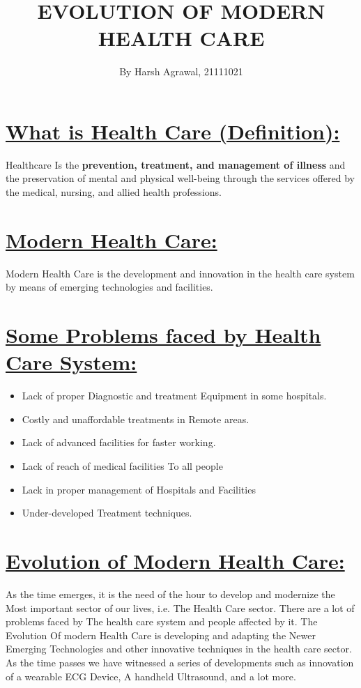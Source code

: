 \documentclass[12pt]{article}
\title{\textbf{EVOLUTION OF MODERN HEALTH CARE}}
\author{By Harsh Agrawal, 21111021}
\date{}
\begin{document}
\maketitle
\raggedright{\section{\underline{What is Health Care (Definition):}}}
Healthcare Is the \textbf{prevention, treatment, and management of illness} and the preservation of mental and physical well-being through the services offered by the medical, nursing, and allied health professions.
\newline
\section{\underline{Modern Health Care:}}
Modern Health Care is the development and innovation in the health care system by means of emerging technologies and facilities.
\newline
\section{\underline{Some Problems faced by Health Care System:}}
\begin{itemize}
\item Lack of proper Diagnostic and treatment Equipment in some hospitals.
\item Costly and unaffordable treatments in Remote areas.
\item Lack of advanced facilities for faster working.
\item Lack of reach of medical facilities To all people
\item Lack in proper management of Hospitals and Facilities
\item Under-developed Treatment techniques.
\end{itemize}

\section{\underline{Evolution of Modern Health Care:}}
As the time emerges, it is the need of the hour to develop and modernize the Most important sector of our lives, i.e. The Health Care sector. There are a lot of problems faced by The health care system and people affected by it. The Evolution Of modern Health Care is developing and adapting the Newer Emerging Technologies and other innovative techniques in the health care sector. As the time passes we have witnessed a series of developments such as innovation of a wearable ECG Device, A handheld Ultrasound, and a lot more.
\end{document}
